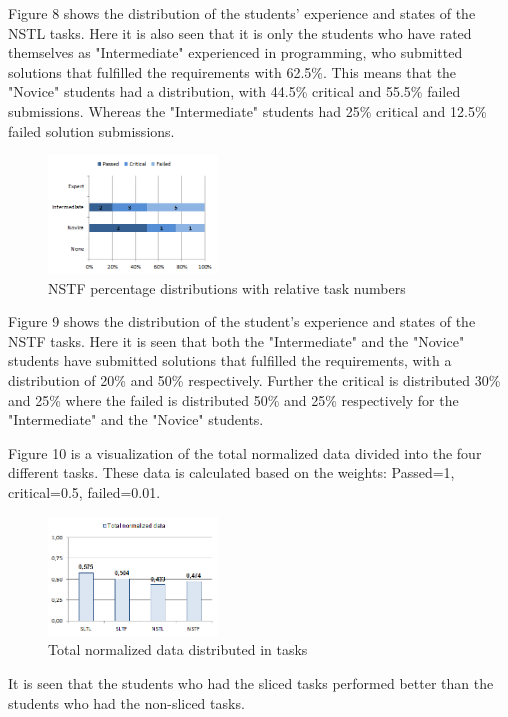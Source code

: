 \documentclass{sig-alternate-05-2015}
\begin{document}
Figure 8 shows the distribution of the students' experience and states of the NSTL tasks. Here it is also seen that it is only the students who have rated themselves as "Intermediate" experienced in programming, who submitted solutions that fulfilled the requirements with 62.5\%. This means that the "Novice" students had a distribution, with 44.5\% critical and 55.5\% failed submissions. Whereas the "Intermediate" students had 25\% critical and 12.5\% failed solution submissions.

\begin{figure}[H]
	\centering
	\includegraphics[width=0.4\textwidth]{img09}
	\caption{NSTF percentage distributions with relative task numbers}
\end{figure}

Figure 9 shows the distribution of the student's experience and states of the NSTF tasks. Here it is seen that both the "Intermediate" and the "Novice" students have submitted solutions that fulfilled the requirements, with a distribution of 20\% and 50\% respectively. Further the critical is distributed 30\% and 25\% where the failed is distributed 50\% and 25\% respectively for the "Intermediate" and the "Novice" students.

Figure 10 is a visualization of the total normalized data divided into the four different tasks. These data is calculated based on the weights: Passed=1, critical=0.5, failed=0.01.

\begin{figure}[H]
	\centering
	\includegraphics[width=0.4\textwidth]{img10}
	\caption{Total normalized data distributed in tasks}
\end{figure}

It is seen that the students who had the sliced tasks performed better than the students who had the non-sliced tasks.
\end{document}
